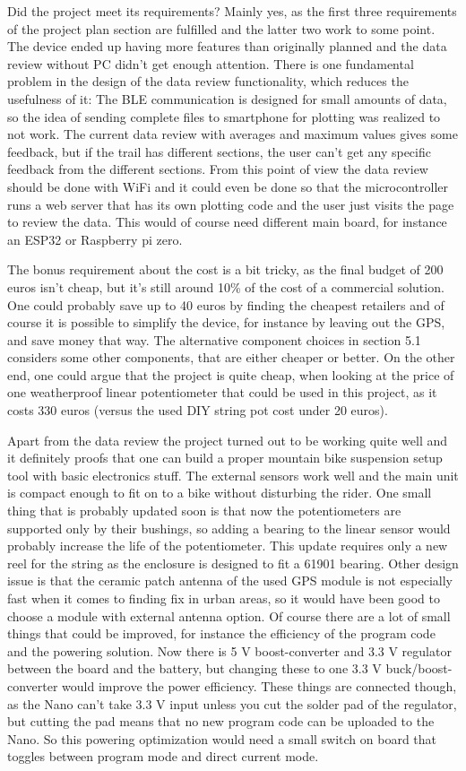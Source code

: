 \documentclass[a4paper,11pt]{article} %
\begin{document}
Did the project meet its requirements? Mainly yes, as the first three requirements of the project plan section are fulfilled and the latter two work to some point. The device ended up having more features than originally planned and the data review without PC didn't get enough attention. There is one fundamental problem in the design of the data review functionality, which reduces the usefulness of it: The BLE communication is designed for small amounts of data, so the idea of sending complete files to smartphone for plotting was realized to not work. The current data review with averages and maximum values gives some feedback, but if the trail has different sections, the user can't get any specific feedback from the different sections. From this point of view the data review should be done with WiFi and it could even be done so that the microcontroller runs a web server that has its own plotting code and the user just visits the page to review the data. This would of course need different main board, for instance an ESP32 or Raspberry pi zero.

The bonus requirement about the cost is a bit tricky, as the final budget of 200 euros isn't cheap, but it's still around 10\% of the cost of a commercial solution. One could probably save up to 40 euros by finding the cheapest retailers and of course it is possible to simplify the device, for instance by leaving out the GPS, and save money that way. The alternative component choices in section 5.1 considers some other components, that are either cheaper or better. On the other end, one could argue that the project is quite cheap, when looking at the price of one weatherproof linear potentiometer that could be used in this project, as it costs 330 euros (versus the used DIY string pot cost under 20 euros).

Apart from the data review the project turned out to be working quite well and it definitely proofs that one can build a proper mountain bike suspension setup tool with basic electronics stuff. The external sensors work well and the main unit is compact enough to fit on to a bike without disturbing the rider. One small thing that is probably updated soon is that now the potentiometers are supported only by their bushings, so adding a bearing to the linear sensor would probably increase the life of the potentiometer. This update requires only a new reel for the string as the enclosure is designed to fit a 61901 bearing. Other design issue is that the ceramic patch antenna of the used GPS module is not especially fast when it comes to finding fix in urban areas, so it would have been good to choose a module with external antenna option. Of course there are a lot of small things that could be improved, for instance the efficiency of the program code and the powering solution. Now there is 5 V boost-converter and 3.3 V regulator between the board and the battery, but changing these to one 3.3 V buck/boost-converter would improve the power efficiency. These things are connected though, as the Nano can't take 3.3 V input unless you cut the solder pad of the regulator, but cutting the pad means that no new program code can be uploaded to the Nano. So this powering optimization would need a small switch on board that toggles between program mode and direct current mode.
\end{document}
